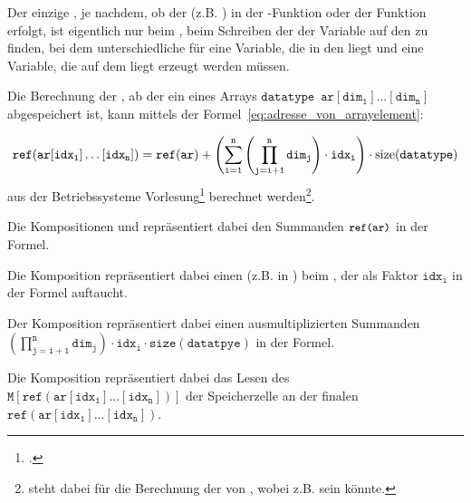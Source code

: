 Der einzige , je nachdem, ob der  (z.B. ) in der  -Funktion oder der Funktion  erfolgt, ist eigentlich nur beim , beim Schreiben der  der Variable  auf den  zu finden, bei dem unterschiedliche  für eine Variable, die in den  liegt und eine Variable, die auf dem  liegt erzeugt werden müssen.

\begin{Special_Paragraph}
  Die Berechnung der , ab der ein  eines Arrays $\mathtt{datatype\enspace ar[dim_1]\ldots[dim_n]}$ abgespeichert ist, kann mittels der Formel~\ref{eq:adresse_von_arrayelement}:


  \begin{equation}
  \mathtt{ref(ar[idx_1]\ldots[idx_n]) = ref(ar) + \left(\sum_{i=1}^{n}\left(\prod_{j=i+1}^{n} dim_{j}\right) \cdot idx_{i}\right) \cdot \operatorname{size}(datatype)} \\
    \label{eq:adresse_von_arrayelement}
  \end{equation}
  aus der Betriebssysteme Vorlesung\footcite{scholl_betriebssysteme_2020} berechnet werden\footnote{ steht dabei für die Berechnung der  von , wobei  z.B.  sein könnte.}.

  Die Kompositionen  und  repräsentiert dabei den Summanden ${\small\texttt{ref(ar)}}$ in der Formel.

  Die Komposition  repräsentiert dabei einen  (z.B.  in ) beim , der als Faktor $\mathtt{idx_i}$ in der Formel auftaucht.

  Der Komposition  repräsentiert dabei einen ausmultiplizierten Summanden $\mathtt{\left(\prod_{j=i+1}^{n} dim_{j}\right) \cdot idx_{i} \cdot size(datatpye)}$ in der Formel.

Die Komposition  repräsentiert dabei das Lesen des  $\mathtt{M\left[ref(ar[idx_1]\ldots[idx_n])\right]}$ der Speicherzelle an der finalen   $\mathtt{ref(ar[idx_1]\ldots[idx_n])}$.
\end{Special_Paragraph}

